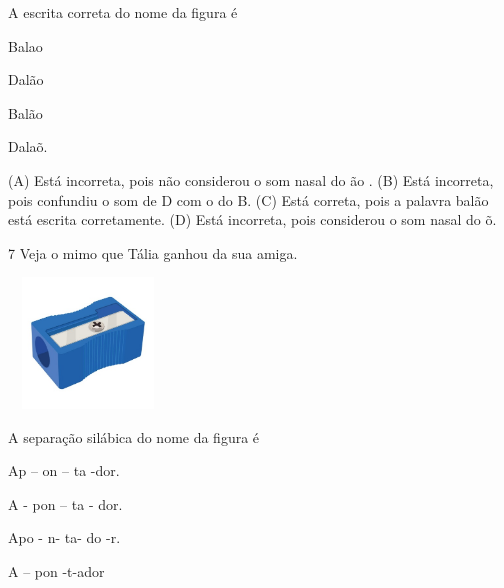 A escrita correta do nome da figura é

\begin{escolha}
\item Balao

\item Dalão

\item Balão

\item Dalaõ.
\end{escolha}


(A) Está incorreta, pois não considerou o som nasal do ão .
(B) Está incorreta, pois confundiu o som de D com o do B.
(C) Está correta, pois a palavra balão está escrita corretamente.
(D) Está incorreta, pois considerou o som nasal do õ.

\num{7} Veja o mimo que Tália ganhou da sua amiga.

\includegraphics[width=1.67273in,height=1.37251in]{media/image168.jpeg}


A separação silábica do nome da figura é

\begin{escolha}
\item Ap -- on -- ta -dor.

\item A - pon -- ta - dor.

\item Apo - n- ta- do -r.

\item A -- pon -t-ador
\end{escolha}


